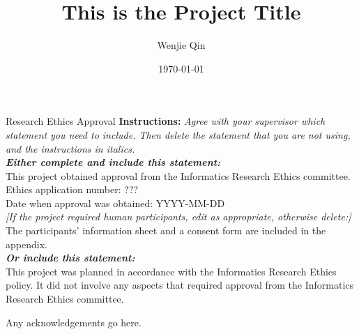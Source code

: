 \documentclass[logo,msc]{infthesis}           %
\begin{document}
\begin{preliminary}

\title{This is the Project Title}

\author{Wenjie Qin}

\date{\today}


\maketitle

\newenvironment{ethics}
   {\begin{frontenv}{Research Ethics Approval}{\LARGE}}
   {\end{frontenv}\newpage}

\begin{ethics}
\textbf{Instructions:} \emph{Agree with your supervisor which
statement you need to include. Then delete the statement that you are not using,
and the instructions in italics.\\
\textbf{Either complete and include this statement:}}\\ %
%
This project obtained approval from the Informatics Research Ethics committee.\\
Ethics application number: ???\\
Date when approval was obtained: YYYY-MM-DD\\
%
\emph{[If the project required human participants, edit as appropriate, otherwise delete:]}\\ %
The participants' information sheet and a consent form are included in the appendix.\\
%
\textbf{\emph{Or include this statement:}}\\ %
This project was planned in accordance with the Informatics Research
Ethics policy. It did not involve any aspects that required approval
from the Informatics Research Ethics committee.

\standarddeclaration
\end{ethics}


\begin{acknowledgements}
Any acknowledgements go here.
\end{acknowledgements}


\tableofcontents
\end{preliminary}
\end{document}
